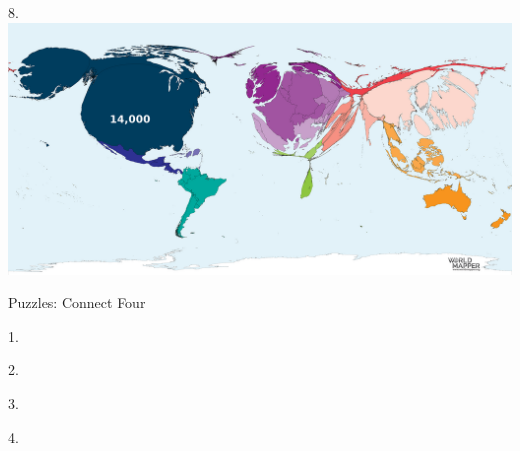 \begin{frame}
\begin{center}
\Large
8. 
\\
\vspace{0.5em}\includegraphics[height=0.6\paperheight]{maps/picture_8.png}
\\
\end{center}
\end{frame}
\begin{frame}
\begin{center}
\Huge
Puzzles: Connect Four
\end{center}
\end{frame}
\begin{frame}
\begin{center}
\Large
1. 
\end{center}
\end{frame}
\begin{frame}
\begin{center}
\Large
2. 
\end{center}
\end{frame}
\begin{frame}
\begin{center}
\Large
3. 
\end{center}
\end{frame}
\begin{frame}
\begin{center}
\Large
4. 
\end{center}
\end{frame}
